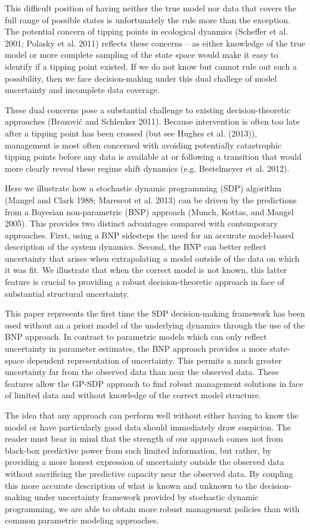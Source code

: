 \documentclass[author-year, review]{elsarticle} %
\begin{document}
This difficult position of having neither the true model nor data that
covers the full range of possible states is unfortunately the rule more
than the exception. The potential concern of tipping points in
ecological dyanmics (Scheffer et al. 2001; Polasky et al. 2011) reflects
these concerns -- as either knowledge of the true model or more complete
sampling of the state space would make it easy to identify if a tipping
point existed. If we do not know but cannot rule out such a possibility,
then we face decision-making under this dual challege of model
uncertainty and incomplete data coverage.

These dual concerns pose a substantial challenge to existing
decision-theoretic approaches (Brozović and Schlenker 2011). Because
intervention is often too late after a tipping point has been crossed
(but see Hughes et al. (2013)), management is most often concerned with
avoiding potentially catastrophic tipping points before any data is
available at or following a transition that would more clearly reveal
these regime shift dynamics (e.g. Bestelmeyer et al. 2012).

Here we illustrate how a stochastic dynamic programming (SDP) algorithm
(Mangel and Clark 1988; Marescot et al. 2013) can be driven by the
predictions from a Bayesian non-parametric (BNP) approach (Munch,
Kottas, and Mangel 2005). This provides two distinct advantages compared
with contemporary approaches. First, using a BNP sidesteps the need for
an accurate model-based description of the system dynamics. Second, the
BNP can better reflect uncertainty that arises when extrapolating a
model outside of the data on which it was fit. We illustrate that when
the correct model is not known, this latter feature is crucial to
providing a robust decision-theoretic approach in face of substantial
structural uncertainty.

This paper represents the first time the SDP decision-making framework
has been used without an a priori model of the underlying dynamics
through the use of the BNP approach. In contrast to parametric models
which can only reflect uncertainty in parameter estimates, the BNP
approach provides a more state-space dependent representation of
uncertainty. This permits a much greater uncertainty far from the
observed data than near the observed data. These features allow the
GP-SDP approach to find robust management solutions in face of limited
data and without knowledge of the correct model structure.

The idea that any approach can perform well without either having to
know the model or have particularly good data should immediately draw
suspicion. The reader must bear in mind that the strength of our
approach comes not from black-box predictive power from such limited
information, but rather, by providing a more honest expression of
uncertainty outside the observed data without sacrificing the predictive
capacity near the observed data. By coupling this more accurate
description of what is known and unknown to the decision-making under
uncertainty framework provided by stochastic dynamic programming, we are
able to obtain more robust management policies than with common
parametric modeling approaches.
\end{document}
